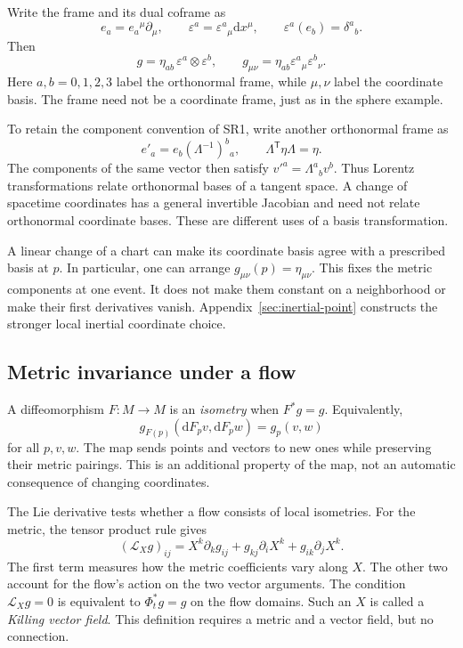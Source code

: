 \documentclass[11pt,a4paper]{article}
\numberwithin{equation}{section}
\newcommand{\dd}{\mathrm d}
\newcommand{\Lie}{\mathcal L}
\begin{document}
Write the frame and its dual coframe as
\[
 e_a=e_a{}^\mu\partial_\mu,\qquad
 \varepsilon^a=\varepsilon^a{}_\mu\dd x^\mu,
 \qquad \varepsilon^a(e_b)=\delta^a{}_b.
\]
Then
\[
 g=\eta_{ab}\,\varepsilon^a\otimes\varepsilon^b,
 \qquad g_{\mu\nu}=\eta_{ab}\varepsilon^a{}_\mu\varepsilon^b{}_\nu.
\]
Here \(a,b=0,1,2,3\) label the orthonormal frame, while \(\mu,\nu\)
label the coordinate basis. The frame need not be a coordinate frame,
just as in the sphere example.

To retain the component convention of SR1, write another orthonormal
frame as
\[
 e'_a=e_b(\Lambda^{-1})^b{}_a,
 \qquad \Lambda^{\mathsf T}\eta\Lambda=\eta.
\]
The components of the same vector then satisfy
\(v'^a=\Lambda^a{}_b v^b\). Thus Lorentz transformations relate
orthonormal bases of a tangent space. A change of spacetime coordinates
has a general invertible Jacobian and need not relate orthonormal
coordinate bases. These are different uses of a basis transformation.

A linear change of a chart can make its coordinate basis agree with
a prescribed basis at \(p\). In particular, one can arrange
\(g_{\mu\nu}(p)=\eta_{\mu\nu}\). This fixes the metric components
at one event. It does not make them constant on a neighborhood or
make their first derivatives vanish. Appendix~\ref{sec:inertial-point}
constructs the stronger local inertial coordinate choice.

\subsection{Metric invariance under a flow}

A diffeomorphism \(F:M\to M\) is an \emph{isometry} when \(F^*g=g\).
Equivalently,
\[
 g_{F(p)}(\dd F_pv,\dd F_pw)=g_p(v,w)
\]
for all \(p,v,w\). The map sends points and vectors to new ones while
preserving their metric pairings. This is an additional property of
the map, not an automatic consequence of changing coordinates.

The Lie derivative tests whether a flow consists of local isometries.
For the metric, the tensor product rule gives
\begin{equation}
 (\Lie_Xg)_{ij}
 =X^k\partial_k g_{ij}+g_{kj}\partial_iX^k+g_{ik}\partial_jX^k.
 \label{eq:lie-metric}
\end{equation}
The first term measures how the metric coefficients vary along \(X\).
The other two account for the flow's action on the two vector arguments.
The condition \(\Lie_Xg=0\) is equivalent to \(\Phi_t^*g=g\) on the
flow domains. Such an \(X\) is called a \emph{Killing vector field}.
This definition requires a metric and a vector field, but no connection.
\end{document}
